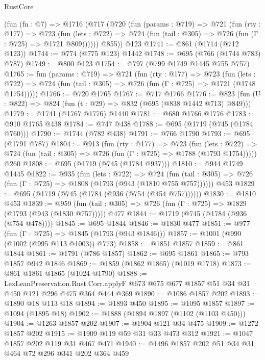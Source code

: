\begin{lexlean}{RustCore}
\begin{coremodule}
    (fun (fn : @7) =>
    @1716
      (@717
        (@720
          (fun (params : @719) =>
          @721
            (fun (rty : @177) =>
            @723
              (fun (lets : @722) =>
              @724 (fun (tail : @305) => @726 (fun (Γ : @725) => @1721 @809))))))
        @855))
    @123
@1741 := @861 (@1714 (@712 @123))
@1744 := @774 (@775 @123) @1442
@1748 := @695 (@766 (@1744 @783) @787)
@1749 := @800 @123
@1754 := @797 (@799 @1749 @1445 @755 @757)
@1765 := fun (params : @719) =>
  @721
    (fun (rty : @177) =>
    @723
      (fun (lets : @722) =>
      @724 (fun (tail : @305) => @726 (fun (Γ : @725) => @1721 (@1748 @1754)))))
@1766 := @720 @1765
@1767 := @717 @1766
@1776 := @823 (fun (U : @822) => @824 (fun (t : @29) => @832 (@695 (@838 @1442 @713) @849)))
@1779 := @1741 (@1767 @1776) @1440
@1781 := @680 @1766 @1776
@1783 := @910 @1765 @438
@1784 := @747 @438
@1788 := @695 (@1719 (@745 (@1784 @760)))
@1790 := @1744 (@782 @438)
@1791 := @766 @1790
@1793 := @695 (@1791 @787)
@1804 := @913
    (fun (rty : @177) =>
    @723
      (fun (lets : @722) =>
      @724 (fun (tail : @305) => @726 (fun (Γ : @725) => @1788 (@1793 @1754)))))
    @260
@1808 := @695 (@1719 (@745 (@1784 @937)))
@1810 := @944 @1749 @1445
@1822 := @935
    (fun (lets : @722) =>
    @724 (fun (tail : @305) => @726 (fun (Γ : @725) => @1808 (@1793 (@943 (@1810 @755 @757))))))
    @453
@1829 := @695 (@1719 (@745 (@1784 (@936 (@754 (@454 @757))))))
@1830 := @1810 @453
@1839 := @959 (fun (tail : @305) => @726 (fun (Γ : @725) => @1829 (@1793 (@943 (@1830 @757))))) @477
@1844 := @1719 (@745 (@1784 (@936 (@754 @478))))
@1845 := @695 @1844
@1846 := @1830 @477
@1851 := @977 (fun (Γ : @725) => @1845 (@1793 (@943 @1846)))
@1857 := @1001 (@990 (@1002 (@995 @113 @1003)) @773)
@1858 := @1851 @1857
@1859 := @861 @1844
@1861 := @1791 (@786 @1857)
@1862 := @695 @1861
@1865 := @793 @1857 @942 @1846
@1869 := @1859 (@1862 @1865) (@1019 @1718)
@1873 := @861 @1861 @1865 (@1024 @1790)
@1888 := LexLeanPreservation.Rust.Corr.applyF
    @673
    @675
    @677
    @1857
    @51
    @34
    @31
    @450
    @121
    @296
    @475
    @364
    @444
    @369
@1890 := @1086 @1857 @202
@1893 := @1890 @18 @113 @18
@1894 := @1893 @450
@1895 := @1095 @1857
@1897 := @1094 (@1895 @18)
@1902 := @1888 (@1894 @1897 (@1102 (@1103 @450)))
@1904 := @1263 @1857 @202
@1907 := @1904 @121 @34 @475
@1909 := @1272 @1857 @202
@1915 := @1909 @119 @59 @31 @33 @473 @312
@1921 := @1047 @1857 @202 @119 @31 @467 @471
@1940 := @1496
    @1857
    @202
    @51
    @34
    @31
    @464
    @72
    @296
    @341
    @202
    @364
    @459

\end{coremodule}
\end{lexlean}
